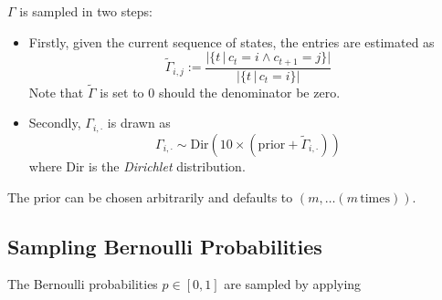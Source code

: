  


 	$\Gamma$ is sampled in two steps:
 	\begin{itemize}
 		\item Firstly, given the current sequence of states, the entries are estimated as 
 			\[
 				\tilde{\Gamma}_{i, j} := \frac{ 
 					\Bigg| \Big\{ t \, | \, c_t = i \land c_{t+1} = j \Big\}\Bigg|	
 				 }{
 			 			\Bigg| \Big\{ t \, | \, c_t = i \Big\}\Bigg|	
 		 		}
 			\]
 			Note that $\tilde{\Gamma}$  is set to $0$ should the denominator be zero. 
 		\item Secondly, $\Gamma_{i, \cdot}$ is drawn as 
 			\[
 				\Gamma_{i, \cdot} \sim  \text{Dir}(10 \times (\text{prior} + \tilde{\Gamma}_{i, \cdot }))
 			\]
 			where Dir is the \textit{Dirichlet} distribution. 
 	\end{itemize}
 
 	The prior can be chosen arbitrarily and defaults to  $\left(m, \dots (m \, \text{times})\right)$.
 	
 	
 	\subsection{Sampling Bernoulli Probabilities}
 		The Bernoulli probabilities $p \in [0,1]$ are sampled by applying 
 	
 		
 	
 		